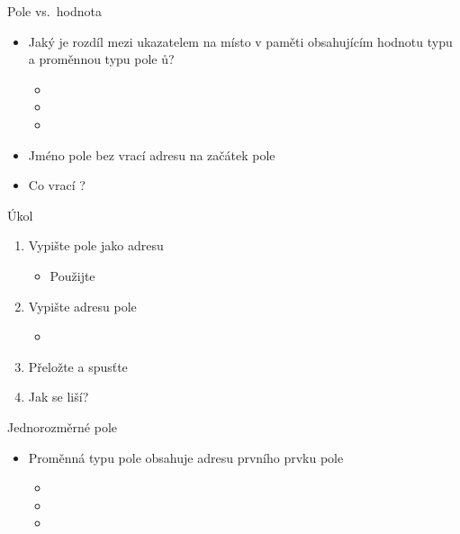 \begin{frame}{Pole vs.\ hodnota}

  \begin{itemize}
    \item Jaký je rozdíl mezi ukazatelem na místo v paměti obsahujícím hodnotu
      typu  a proměnnou typu pole ů?
    \begin{itemize}
      \item {}
      \item {}
      \item {}
    \end{itemize}

    \pause

    \item Jméno pole bez \code{[]} vrací adresu na začátek pole

    \pause

    \item Co vrací ?
  \end{itemize}

\end{frame}

\begin{frame}{Úkol}

  \begin{enumerate}
    \item Vypište pole jako adresu
    \begin{itemize}
      \item Použijte 
    \end{itemize}

    \item Vypište adresu pole
    \begin{itemize}
      \item {}
    \end{itemize}

    \item Přeložte a spusťte
    \item Jak se liší?
  \end{enumerate}

\end{frame}

\begin{frame}{Jednorozměrné pole}

  \begin{itemize}
    \item Proměnná typu pole obsahuje adresu prvního prvku pole
    \begin{itemize}
      \item {}
      \item {}
      \item {}
    \end{itemize}
  \end{itemize}

\end{frame}

